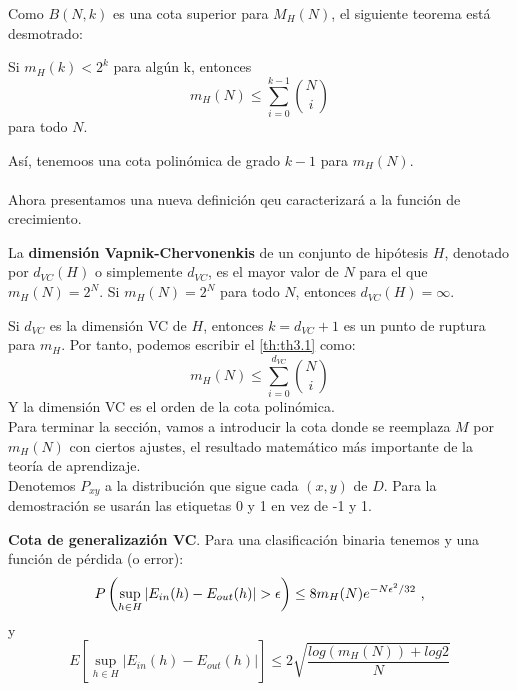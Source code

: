 Como $B(N,k)$ es una cota superior para $M_{H}(N)$, el siguiente teorema está desmotrado:
\begin{teorema}\label{th:th3.1}
Si $m_{H}(k)<2^{k}$ para algún k, entonces
\[ m_{H}(N) \leq \sum_{i=0}^{k-1} \binom{N}{i} \]
para todo $N$.
\end{teorema}
Así, tenemoos una cota polinómica de grado $k-1$ para $m_{H}(N)$.\cite{abu2012learning}\\\\
Ahora presentamos una nueva definición qeu caracterizará a la función de crecimiento.
\begin{definicion}
La \textbf{dimensión Vapnik-Chervonenkis} de un conjunto de hipótesis $H$, denotado por $d_{VC}(H)$ o simplemente $d_{VC}$, es el mayor valor de $N$ para el que $m_{H}(N)=2^{N}$. Si $m_{H}(N)=2^{N}$ para todo $N$, entonces $d_{VC}(H)=\infty$.
\end{definicion}
Si $d_{VC}$ es la dimensión VC de $H$, entonces $k=d_{VC}+1$ es un punto de ruptura para $m_{H}$. Por tanto, podemos escribir el \autoref{th:th3.1} como:
\[  m_{H}(N) \leq \sum_{i=0}^{d_{VC}} \binom{N}{i} \]
Y la dimensión VC es el orden de la cota polinómica.\\
Para terminar la sección, vamos a introducir la cota donde se reemplaza $M$ por $m_{H}(N)$ con ciertos ajustes, el resultado matemático más importante de la teoría de aprendizaje. \cite{abu2012learning}\\
Denotemos $P_{xy}$ a la distribución que sigue cada $(x,y)$ de $D$. Para la demostración se usarán las etiquetas 0 y 1 en vez de -1 y 1.
\begin{teorema}
\textbf{Cota de generalizazión VC}. Para una clasificación binaria tenemos y una función de pérdida (o error):
\[ P \left( \sup_{h \in H} \vert E_{in}(h)-E_{out}(h) \vert > \epsilon \right) \leq 8m_{H}(N)e^{-N \epsilon^{2}/32} \textnormal{ ,} \]
y
\[ E \left[ \sup_{h \in H} \vert E_{in}(h)-E_{out}(h) \vert \right] \leq 2 \sqrt{\frac{log(m_{H}(N))+log2}{N}} \]
\end{teorema}
